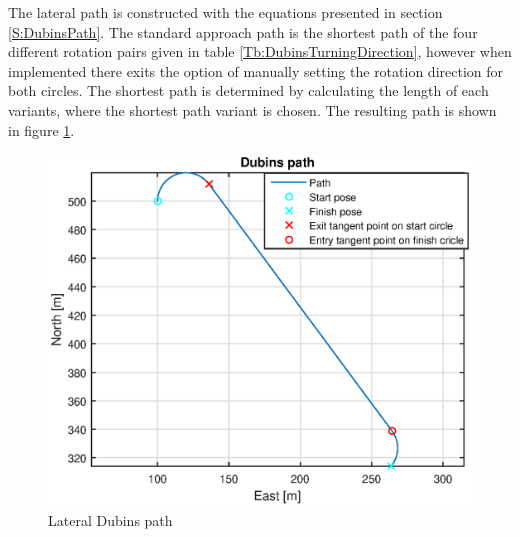 The lateral path is constructed with the equations presented in section \ref{S:DubinsPath}. The standard approach path is the shortest path of the four different rotation pairs given in table \ref{Tb:DubinsTurningDirection}, however when implemented there exits the option of manually setting the rotation direction for both circles. The shortest path is determined by calculating the length of each variants, where the shortest path variant is chosen. The resulting path is shown in figure \ref{Fig:LateralPath}.
\begin{figure}[H]
	\centering
		\includegraphics[width=1\textwidth]{figs/SysPlot/DubinsPath.eps}
		\caption{Lateral Dubins path}
		\label{Fig:LateralPath}
\end{figure}

